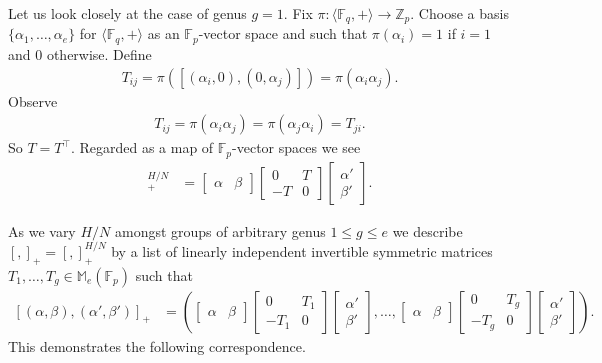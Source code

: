 \documentclass{toc}
\numberwithin{equation}{section}
\theoremstyle{plain}       %
\theoremstyle{remark}
\theoremstyle{definition}
\numberwithin{figure}{section}
\numberwithin{table}{section}
\newcommand{\bbF}{\mathbb{F}}  %
\begin{document}
Let us look closely at the case of genus $g=1$.  Fix
$\pi:\langle\bbF_q,+\rangle\to \mathbb{Z}_p$.  Choose a basis
$\{\alpha_1,\dots,\alpha_e\}$ for $\langle \bbF_q,+\rangle$ as an
$\bbF_p$-vector space and such that $\pi(\alpha_i)=1$ if $i=1$ and $0$
otherwise.  Define 
\begin{align*}
	T_{ij}=\pi([(\alpha_i,0),(0,\alpha_j)]) = \pi(\alpha_i \alpha_j).
\end{align*}
Observe 
\begin{align}\label{eq:T-sym}
	T_{ij}=\pi(\alpha_i\alpha_j) =\pi(\alpha_j\alpha_i)=T_{ji}.
\end{align}
So $T=T^{\top}$.  Regarded as a map of $\bbF_p$-vector spaces we see
\begin{align*}
	[(\alpha,\beta),(\alpha',\beta')]_+^{H/N} & = 
		\begin{bmatrix} \alpha & \beta\end{bmatrix}
		\begin{bmatrix} 0 & T\\ -T & 0 \end{bmatrix}
		\begin{bmatrix} \alpha'\\ \beta'\end{bmatrix}.
\end{align*}

As we vary $H/N$ amongst groups of arbitrary genus $1\leq g\leq e$ we describe
$[,]_+=[,]_+^{H/N}$ by a list of linearly independent invertible symmetric
matrices $T_1,\dots,T_g\in \mathbb{M}_e(\bbF_p)$ such that
\begin{align}\label{def:gettable}
	[(\alpha,\beta),(\alpha',\beta')]_+ & = 
		\left(
		\begin{bmatrix} \alpha &\beta \end{bmatrix}\!
		\begin{bmatrix} 0 & T_1\\ -T_1 & 0 \end{bmatrix}\!
		\begin{bmatrix}\alpha'\\ \beta'\end{bmatrix},
		\dots,
		\begin{bmatrix} \alpha &\beta \end{bmatrix}\!
		\begin{bmatrix} 0 & T_g\\ -T_g & 0 \end{bmatrix}\!
		\begin{bmatrix}\alpha'\\  \beta'\end{bmatrix}\right).
\end{align}
This demonstrates the following correspondence.
\end{document}
